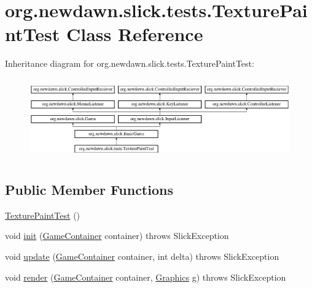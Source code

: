 \hypertarget{classorg_1_1newdawn_1_1slick_1_1tests_1_1_texture_paint_test}{}\section{org.\+newdawn.\+slick.\+tests.\+Texture\+Paint\+Test Class Reference}
\label{classorg_1_1newdawn_1_1slick_1_1tests_1_1_texture_paint_test}
Inheritance diagram for org.\+newdawn.\+slick.\+tests.\+Texture\+Paint\+Test\+:\begin{figure}[H]
\begin{center}
\leavevmode
\includegraphics[height=3.522012cm]{classorg_1_1newdawn_1_1slick_1_1tests_1_1_texture_paint_test}
\end{center}
\end{figure}
\subsection*{Public Member Functions}
\begin{DoxyCompactItemize}
\item 
\mbox{\hyperlink{classorg_1_1newdawn_1_1slick_1_1tests_1_1_texture_paint_test_a2f80b6372e63d8906b0bb064b97847ea}{Texture\+Paint\+Test}} ()
\item 
void \mbox{\hyperlink{classorg_1_1newdawn_1_1slick_1_1tests_1_1_texture_paint_test_a9d66cb695e1e0d4380b0869164e69a7d}{init}} (\mbox{\hyperlink{classorg_1_1newdawn_1_1slick_1_1_game_container}{Game\+Container}} container)  throws Slick\+Exception 
\item 
void \mbox{\hyperlink{classorg_1_1newdawn_1_1slick_1_1tests_1_1_texture_paint_test_a18372b798863b28f1f6918adeaa2133c}{update}} (\mbox{\hyperlink{classorg_1_1newdawn_1_1slick_1_1_game_container}{Game\+Container}} container, int delta)  throws Slick\+Exception 
\item 
void \mbox{\hyperlink{classorg_1_1newdawn_1_1slick_1_1tests_1_1_texture_paint_test_a51c7f49d67b05aabc0de200bf664f854}{render}} (\mbox{\hyperlink{classorg_1_1newdawn_1_1slick_1_1_game_container}{Game\+Container}} container, \mbox{\hyperlink{classorg_1_1newdawn_1_1slick_1_1_graphics}{Graphics}} g)  throws Slick\+Exception 
\end{DoxyCompactItemize}
